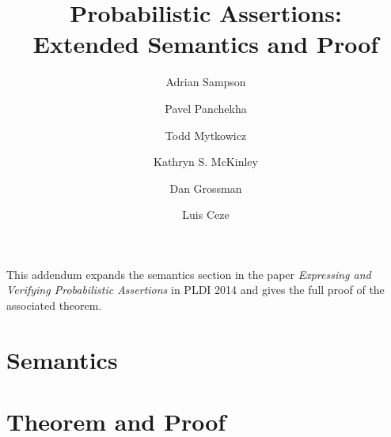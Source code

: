 \documentclass{article}
\title{Probabilistic Assertions: \\
Extended Semantics and Proof}
\author{Adrian Sampson \and Pavel Panchekha \and Todd Mytkowicz \and Kathryn
    S. McKinley \and
Dan Grossman \and Luis Ceze}
\date{}
\begin{document}
\maketitle

\def\expandedversion{1}

This addendum expands the semantics section in the paper \textit{Expressing
and Verifying Probabilistic Assertions} in PLDI 2014 and gives the
full proof of the associated theorem.

\section{Semantics}


\section{Theorem and Proof}

\end{document}
